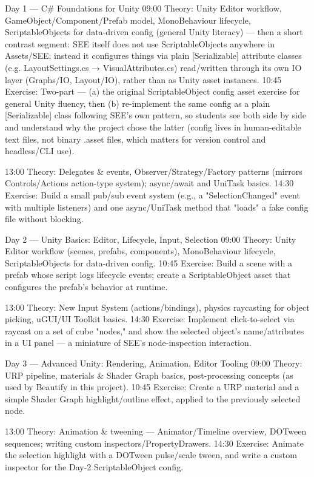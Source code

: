 Day 1 — C# Foundations for Unity
09:00 Theory: Unity Editor workflow, GameObject/Component/Prefab model, MonoBehaviour lifecycle, ScriptableObjects for data-driven config (general Unity literacy) — then a short contrast segment: SEE itself does not use ScriptableObjects anywhere in Assets/SEE; instead it configures things via plain [Serializable] attribute classes (e.g. LayoutSettings.cs → VisualAttributes.cs) read/written through its own IO layer (Graphs/IO, Layout/IO), rather than as Unity asset instances.
10:45 Exercise: Two-part — (a) the original ScriptableObject config asset exercise for general Unity fluency, then (b) re-implement the same config as a plain [Serializable] class following SEE's own pattern, so students see both side by side and understand why the project chose the latter (config lives in human-editable text files, not binary .asset files, which matters for version control and headless/CLI use).

13:00 Theory: Delegates & events, Observer/Strategy/Factory patterns (mirrors Controls/Actions action-type system); async/await and UniTask basics.
14:30 Exercise: Build a small pub/sub event system (e.g., a "SelectionChanged" event with multiple listeners) and one async/UniTask method that "loads" a fake config file without blocking.

Day 2 — Unity Basics: Editor, Lifecycle, Input, Selection
09:00 Theory: Unity Editor workflow (scenes, prefabs, components), MonoBehaviour lifecycle, ScriptableObjects for data-driven config.
10:45 Exercise: Build a scene with a prefab whose script logs lifecycle events; create a ScriptableObject asset that configures the prefab's behavior at runtime.

13:00 Theory: New Input System (actions/bindings), physics raycasting for object picking, uGUI/UI Toolkit basics.
14:30 Exercise: Implement click-to-select via raycast on a set of cube "nodes," and show the selected object's name/attributes in a UI panel — a miniature of SEE's node-inspection interaction.

Day 3 — Advanced Unity: Rendering, Animation, Editor Tooling
09:00 Theory: URP pipeline, materials & Shader Graph basics, post-processing concepts (as used by Beautify in this project).
10:45 Exercise: Create a URP material and a simple Shader Graph highlight/outline effect, applied to the previously selected node.

13:00 Theory: Animation & tweening — Animator/Timeline overview, DOTween sequences; writing custom inspectors/PropertyDrawers.
14:30 Exercise: Animate the selection highlight with a DOTween pulse/scale tween, and write a custom inspector for the Day-2 ScriptableObject config.

